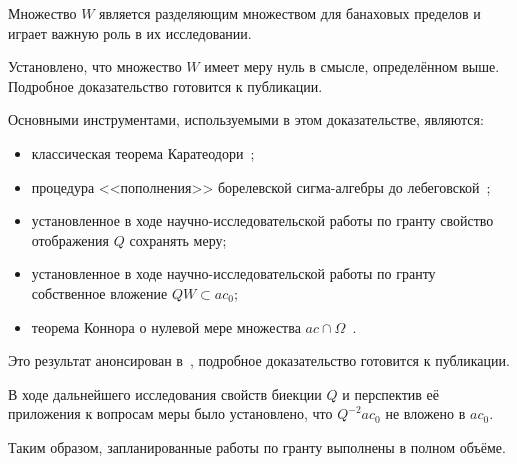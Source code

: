 \documentclass[a4paper,openbib]{report}
\theoremstyle{definition}
\begin{document}
Множество $W$ является разделяющим множеством для банаховых пределов
и играет важную роль в их исследовании.

Установлено, что множество $W$ имеет меру нуль в смысле, определённом выше.
Подробное доказательство готовится к публикации.

Основными инструментами, используемыми в этом доказательстве, являются:
\begin{itemize}
	\item
		классическая теорема Каратеодори~\cite[Theorem 1.53]{klenke2013probability};
	\item
		процедура <<пополнения>> борелевской сигма-алгебры до лебеговской~\cite[Example 1.71]{klenke2013probability};
	\item
		установленное в ходе научно-исследовательской работы по гранту свойство отображения $Q$ сохранять меру;
	\item
		установленное в ходе научно-исследовательской работы по гранту собственное вложение $QW \subset ac_0$;
	\item
		теорема Коннора о нулевой мере множества $ac\cap\Omega$~\cite{semenov2010characteristic,connor1990almost}.
\end{itemize}

Это результат анонсирован в~\cite{AvSU}, подробное доказательство готовится к публикации.

В ходе дальнейшего исследования свойств биекции $Q$ и перспектив её приложения к вопросам меры было установлено,
что $Q^{-2}ac_0$ не вложено в $ac_0$.

Таким образом, запланированные работы по гранту выполнены в полном объёме.




\small
\printbibliography{}
\end{document}
